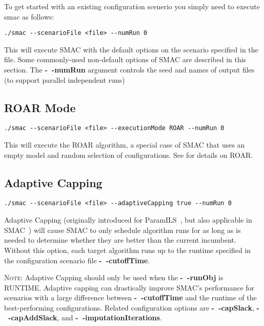To get started with an existing configuration scenerio you simply
need to execute smac as follows:

\begin{verbatim}
./smac --scenarioFile <file> --numRun 0
\end{verbatim}

This will execute SMAC with the default options on the scenario specified in the file. 
Some commonly-used non-default options of SMAC are described in this section. The \textbf{-~$\!$-numRun} argument controls the seed and names of output files (to support parallel independent runs)

\subsection{ROAR Mode}

\begin{verbatim}
./smac --scenarioFile <file> --executionMode ROAR --numRun 0
\end{verbatim}

This will execute the ROAR algorithm, a special case of SMAC that uses an empty model and random selection of 
configurations. See \cite{HutHooLey11-SMAC} for details on ROAR.

\subsection{Adaptive Capping}
\begin{verbatim}
./smac --scenarioFile <file> --adaptiveCapping true --numRun 0
\end{verbatim}
Adaptive Capping (originally introduced for ParamILS~\cite{ParamILS-JAIR}, but also applicable in SMAC~\cite{HutHooLey11-censoring}) will cause SMAC to only schedule algorithm runs for as long as is needed to determine whether they are better than the current incumbent. Without this option, each target algorithm runs up to the runtime specified in the configuration scenario file \textbf{-~$\!$-cutoffTime}.

\noindent{}\textsc{Note:} Adaptive Capping should only be used when the \textbf{-~$\!$-runObj} is RUNTIME.
Adaptive capping can drastically improve SMAC's performance for scenarios with a large difference between 
\textbf{-~$\!$-cutoffTime} and the runtime of the best-performing configurations.
Related configuration options are \textbf{-~$\!$-capSlack}, \textbf{-~$\!$-capAddSlack}, and \textbf{-~$\!$-imputationIterations}.


